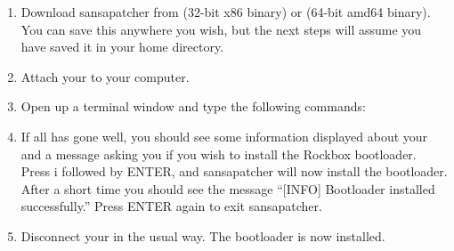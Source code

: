 \begin{enumerate}

\item Download sansapatcher from
 (32-bit x86 
binary) or  
(64-bit amd64 binary). You can save this anywhere you wish, but the next 
steps will assume you have saved it in your home directory.

\item Attach your \dap{} to your computer.

\item Open up a terminal window and type the following commands:



\item If all has gone well, you should see some information displayed about
your \playertype{} and a message asking you if you wish to install the Rockbox
bootloader. Press i followed by ENTER, and sansapatcher will now install the
bootloader. After a short time you should see the message ``[INFO] Bootloader
installed successfully.'' Press ENTER again to exit sansapatcher.

\item Disconnect your \dap{} in the usual way. The bootloader is now installed.

\end{enumerate}
